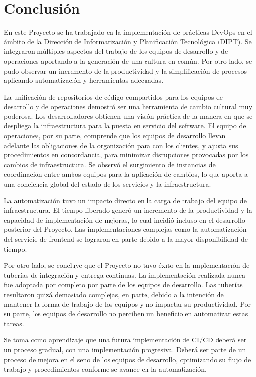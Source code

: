 \chapter{Conclusión}

En este Proyecto se ha trabajado en la implementación de prácticas
DevOps en el ámbito de la Dirección de Informatización y Planificación
Tecnológica (DIPT). Se integraron múltiples aspectos del trabajo de
los equipos de desarrollo y de operaciones aportando a la generación
de una cultura en común. Por otro lado, se pudo observar un incremento
de la productividad y la simplificación de procesos aplicando
automatización y herramientas adecuadas.

La unificación de repositorios de código compartidos para los equipos
de desarrollo y de operaciones demostró ser una herramienta de cambio
cultural muy poderosa. Los desarrolladores obtienen una visión
práctica de la manera en que se despliega la infraestructura para la
puesta en servicio del software. El equipo de operaciones, por su
parte, comprende que los equipos de desarrollo llevan adelante las
obligaciones de la organización para con los clientes, y ajusta sus
procedimientos en concordancia, para minimizar disrupciones provocadas
por los cambios de infraestructura. Se observó el surgimiento de
instancias de coordinación entre ambos equipos para la aplicación de
cambios, lo que aporta a una conciencia global del estado de los
servicios y la infraestructura.

La automatización tuvo un impacto directo en la carga de trabajo del
equipo de infraestructura. El tiempo liberado generó un incremento de
la productividad y la capacidad de implementación de mejoras, lo cual
incidió incluso en el desarrollo posterior del Proyecto. Las
implementaciones complejas como la automatización del servicio de
frontend se lograron en parte debido a la mayor disponibilidad de
tiempo.

Por otro lado, se concluye que el Proyecto no tuvo éxito en la
implementación de tuberías de integración y entrega continuas. La
implementación realizada nunca fue adoptada por completo por parte de
los equipos de desarrollo. Las tuberías resultaron quizá demasiado
complejas, en parte, debido a la intención de mantener la forma de
trabajo de los equipos y no impactar su productividad. Por su parte,
los equipos de desarrollo no perciben un beneficio en automatizar
estas tareas.

Se toma como aprendizaje que una futura implementación de CI/CD deberá
ser un proceso gradual, con una implementación progresiva. Deberá ser
parte de un proceso de mejora en el seno de los equipos de desarrollo,
optimizando su flujo de trabajo y procedimientos conforme se avance en
la automatización.

